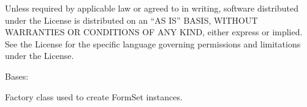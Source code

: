 \documentclass[letterpaper,10pt,english]{sphinxmanual}
\begin{document}
\sphinxAtStartPar
{}

\sphinxAtStartPar
Unless required by applicable law or agreed to in writing, software
distributed under the License is distributed on an “AS IS” BASIS,
WITHOUT WARRANTIES OR CONDITIONS OF ANY KIND, either express or implied.
See the License for the specific language governing permissions and
limitations under the License.

\begin{fulllineitems}
\label{\detokenize{apache_commons_validator_python:apache_commons_validator_python.form_set_factory_new.FormSetFactory}}
\pysigstartsignatures
{}
\pysigstopsignatures
\sphinxAtStartPar
Bases: 

\sphinxAtStartPar
Factory class used to create FormSet instances.


\end{fulllineitems}
\end{document}
